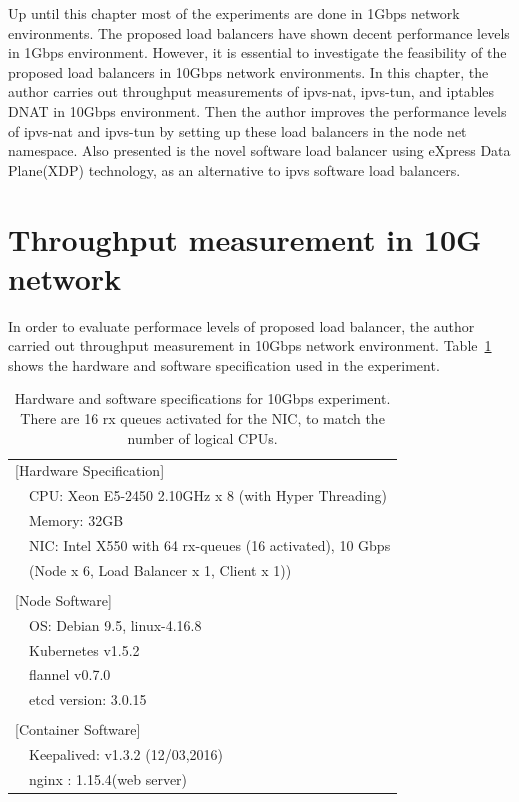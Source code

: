 

Up until this chapter most of the experiments are done in 1Gbps network environments.
The proposed load balancers have shown decent performance levels in 1Gbps environment.
However, it is essential to investigate the feasibility of the proposed load balancers in 10Gbps network environments.
In this chapter, the author carries out throughput measurements of ipvs-nat, ipvs-tun, and iptables DNAT in 10Gbps environment.
Then the author improves the performance levels of ipvs-nat and ipvs-tun by setting up these load balancers in the node net namespace.
Also presented is the novel software load balancer using eXpress Data Plane(XDP) technology, as an alternative to ipvs software load balancers.

\section{Throughput measurement in 10G network}

In order to evaluate performace levels of proposed load balancer, the author carried out throughput measurement in 10Gbps network environment. 
Table~\ref{tab:hw_sw_spec_10g} shows the hardware and software specification used in the experiment.

{
\setlength{\tabcolsep}{1em}
\renewcommand{\arraystretch}{1.2}

\begin{table}[h]
  \centering
  \begin{tabular}{ll}
    \hline 
    \multicolumn{2}{l}{[Hardware Specification]}   \\
    & CPU: Xeon E5-2450 2.10GHz x 8 (with Hyper Threading) \\
    & Memory: 32GB \\
    & NIC: Intel X550 with 64 rx-queues (16 activated), 10 Gbps \\
    & (Node x 6, Load Balancer x 1, Client x 1)) \\
    & \\
    \multicolumn{2}{l}{[Node Software]}  \\
    & OS: Debian 9.5, linux-4.16.8 \\
    & Kubernetes v1.5.2 \\
    & flannel v0.7.0 \\
    & etcd version: 3.0.15 \\
    & \\
    \multicolumn{2}{l}{[Container Software]}   \\
    & Keepalived: v1.3.2 (12/03,2016) \\
    & nginx : 1.15.4(web server) \\
  \hline 
  \end{tabular}
  \par\bigskip
  \centering
  \begin{minipage}{0.9\columnwidth}
    \caption[Hardware and software specifications for 10Gbps experiment]{
      Hardware and software specifications for 10Gbps experiment.
      There are 16 rx queues activated for the NIC, to match the number of logical CPUs.
    }
    \label{tab:hw_sw_spec_10g}
  \end{minipage}
\end{table}
}

